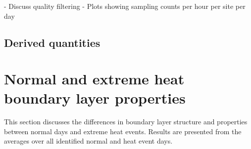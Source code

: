 \documentclass[num-refs]{wiley-article}
\begin{document}
- Discuss quality filtering
- Plots showing sampling counts per hour per site per day


\subsection{Derived quantities}

\section{Normal and extreme heat boundary layer properties}
This section discusses the differences in boundary layer structure and properties between normal days and extreme heat events. Results are presented from the averages over all identified normal and heat event days.
\end{document}
